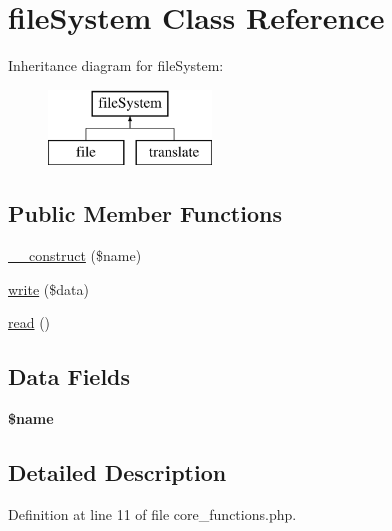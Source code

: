 \hypertarget{classfile_system}{\section{file\-System Class Reference}
\label{classfile_system}
}
Inheritance diagram for file\-System\-:\begin{figure}[H]
\begin{center}
\leavevmode
\includegraphics[height=2.000000cm]{classfile_system}
\end{center}
\end{figure}
\subsection*{Public Member Functions}
\begin{DoxyCompactItemize}
\item 
\hyperlink{classfile_system_a4717bbfc70a40a57ee741ed70766c309}{\-\_\-\-\_\-construct} (\$name)
\item 
\hyperlink{classfile_system_a85013b0dcf138f6997e2a05332ed0dd5}{write} (\$data)
\item 
\hyperlink{classfile_system_a64571309bfb3238c65fd3c2898f92440}{read} ()
\end{DoxyCompactItemize}
\subsection*{Data Fields}
\begin{DoxyCompactItemize}
\item 
\hypertarget{classfile_system_ab2fc40d43824ea3e1ce5d86dee0d763b}{{\bfseries \$name}}\label{classfile_system_ab2fc40d43824ea3e1ce5d86dee0d763b}

\end{DoxyCompactItemize}


\subsection{Detailed Description}


Definition at line 11 of file core\-\_\-functions.\-php.



